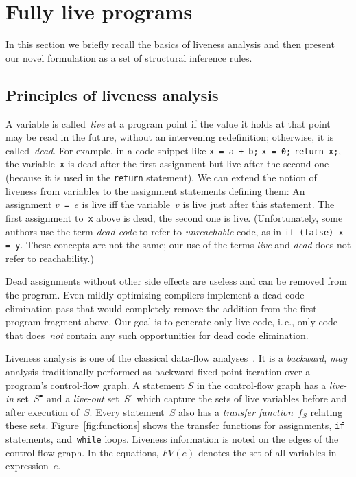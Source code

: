 \documentclass{llncs}
\newcommand{\liveout}[1]{\ensuremath{#1^{\circ}}}
\newcommand{\livein}[1]{\ensuremath{#1^{\bullet}}}
\begin{document}
\section{Fully live programs}

In this section we briefly recall the basics of liveness analysis and then
present our novel formulation as a set of structural inference rules.

\subsection{Principles of liveness analysis}
\label{sec:liveness}

A variable is called~\emph{live} at a program point if the value it holds at
that point may be read in the future, without an intervening redefinition;
otherwise, it is called~\emph{dead}.
For example, in a code snippet like \verb|x = a + b;| \verb|x = 0;|
\verb|return x;|, the variable~\verb|x| is dead after the first assignment
but live after the second one (because it is used in the \verb|return|
statement). We can extend the notion of liveness from variables to the
assignment statements defining them: An assignment \(v\)\verb| = |\(e\) is
live iff the variable~\(v\) is live just after this statement. The
first assignment to~\verb|x| above is dead, the second one is live.
(Unfortunately, some authors
use the term \emph{dead code} to refer to \emph{unreachable} code, as in
\texttt{if (false) x = y}. These concepts are not the same; our use of the
terms \emph{live} and \emph{dead} does not refer to reachability.)

Dead assignments without other side effects are useless and can be removed
from the program. Even mildly optimizing compilers implement a dead code
elimination pass that would completely remove the addition from the first
program fragment above. Our goal is to generate only live code, i.\,e., only
code that does~\emph{not} contain any such opportunities for dead code
elimination.

Liveness analysis is one of the classical data-flow
analyses~\cite{nielson.etal-1999}. It is a \emph{backward}, \emph{may}
analysis traditionally performed as backward fixed-point iteration over a
program's control-flow graph. A statement \(S\) in the control-flow graph
has a \emph{live-in} set~\(\livein{S}\) and a \emph{live-out}
set~\(\liveout{S}\) which capture the sets of live variables before and
after execution of~\(S\). Every statement~\(S\) also has a \emph{transfer
function}~\(f_S\) relating these sets. Figure~\ref{fig:functions} shows the
transfer functions for assignments, \texttt{if} statements,
and~\texttt{while} loops. Liveness information is noted on the edges of the
control flow graph. In the equations, \(FV(e)\) denotes the set of all
variables in expression~\(e\).
\end{document}

